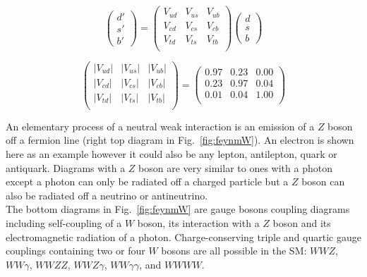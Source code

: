\begin{equation}\label{eq:CKM}
  \begin{pmatrix} d' \\ s' \\ b' \end{pmatrix}
     =
  \begin{pmatrix} 
     V_{ud} & V_{us} & V_{ub} \\
     V_{cd} & V_{cs} & V_{cb} \\
     V_{td} & V_{ts} & V_{tb} \\ 
  \end{pmatrix}
  \begin{pmatrix} d \\ s \\ b \end{pmatrix}
\end{equation}

\begin{equation}\label{eq:CKM_magn}
  \begin{pmatrix} 
     |V_{ud}| & |V_{us}| & |V_{ub}| \\
     |V_{cd}| & |V_{cs}| & |V_{cb}| \\
     |V_{td}| & |V_{ts}| & |V_{tb}| \\ 
  \end{pmatrix}
    =
  \begin{pmatrix} 
     0.97 & 0.23 & 0.00 \\
     0.23 & 0.97 & 0.04 \\
     0.01 & 0.04 & 1.00 \\ 
  \end{pmatrix}
\end{equation}

An elementary process of a neutral weak interaction is an emission of a $Z$ boson off a fermion line (right top diagram in Fig.~\ref{fig:feynmW}). An electron is shown here as an example however it could also be any lepton, antilepton, quark or antiquark. Diagrams with a $Z$ boson are very similar to ones with a photon except a photon can only be radiated off a charged particle but a $Z$ boson can also be radiated off a neutrino or antineutrino.\\

The bottom diagrams in Fig.~\ref{fig:feynmW} are gauge bosons coupling diagrams including self-coupling of a $W$ boson, its interaction with a $Z$ boson and its electromagnetic radiation of a photon. Charge-conserving triple and quartic gauge couplings containing two or four $W$ bosons are all possible in the SM: $WWZ$, $WW\gamma$, $WWZZ$, $WWZ\gamma$, $WW\gamma\gamma$, and $WWWW$.\\


